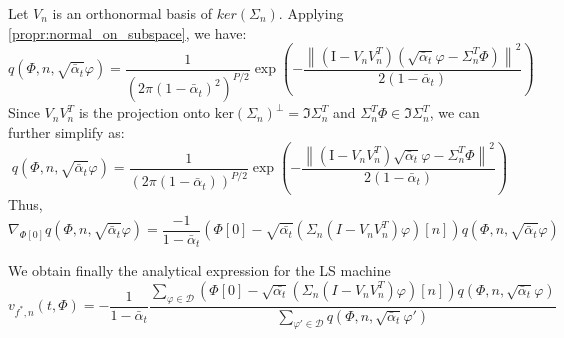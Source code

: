 \documentclass[a4paper,10pt]{article}
\theoremstyle{definition} %
\theoremstyle{definition} %
\theoremstyle{definition} %
\theoremstyle{definition} %
\renewcommand{\ker}[1]{\mathrm{ker}\left( {#1} \right)}
\newcommand{\Id}{\mathrm{I}}
\newcommand{\norm}[1]{\left\| #1 \right \|}
\begin{document}
Let $V_n$ is an orthonormal basis of $ker(\Sigma_n)$. Applying \cref{propr:normal_on_subspace}, we have:
\begin{equation*}
    q(\Phi, n, \sqrt{\bar\alpha_t}\varphi) = \frac{1}{(2\pi (1-\bar\alpha_t)^2)^{P/2}} \exp \left( -\frac{\norm{(\Id - V_n V_n^T)(\sqrt{\bar\alpha_t}\varphi - \Sigma_n^T \Phi)}^2}{2(1-\bar\alpha_t)} \right)
\end{equation*}
Since $ V_nV_n^T$ is the projection onto $\ker{\Sigma_n}^\perp = \Im{\Sigma_n^T}$ and $\Sigma_n^T \Phi \in \Im{\Sigma_n^T}$, we can further simplify as:
\begin{equation*}
    q(\Phi, n, \sqrt{\bar\alpha_t}\varphi) = \frac{1}{(2\pi (1-\bar\alpha_t))^{P/2}} \exp \left( -\frac{\norm{(\Id - V_n V_n^T)\sqrt{\bar\alpha_t}\varphi - \Sigma_n^T \Phi}^2}{2(1-\bar\alpha_t)} \right)
\end{equation*}
Thus,
\begin{equation*}
    \nabla_{\Phi[0]}q(\Phi, n, \sqrt{\bar\alpha_t}\varphi) = \frac{-1}{1-\bar\alpha_t} (\Phi[0] -  \sqrt{\bar{\alpha_t}}(\Sigma_n(I-V_n V_n^T)\varphi)[n]) q(\Phi, n, \sqrt{\bar\alpha_t}\varphi)
\end{equation*}

We obtain finally the analytical expression for the LS machine
\begin{equation}
    v_{f^*,n}(t,\Phi) = -\frac{1}{1-\bar\alpha_t} \frac{\sum_{\varphi\in\mathcal{D}}(\Phi[0] -  \sqrt{\bar{\alpha_t}}(\Sigma_n(I-V_n V_n^T)\varphi)[n]) q(\Phi, n, \sqrt{\bar\alpha_t}\varphi)}{\sum_{\varphi'\in\mathcal{D}} q(\Phi, n, \sqrt{\bar\alpha_t}\varphi')}
\end{equation}







\end{document}
